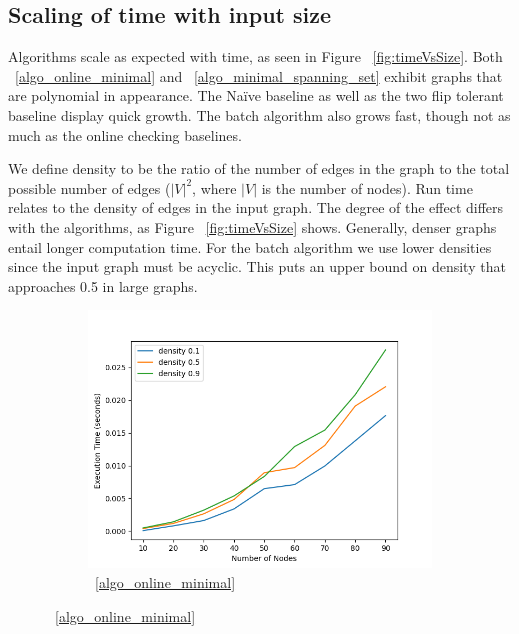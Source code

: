 \documentclass[sigplan,review,anonymous]{acmart}
\begin{document}
{\subsection{Scaling of time with input size}

Algorithms scale as expected with time, as seen in Figure ~\ref{fig:timeVsSize}. 
Both ~\ref{algo_online_minimal} and ~\ref{algo_minimal_spanning_set} exhibit graphs that are polynomial in appearance.
The Na\"{i}ve baseline as well as the two flip tolerant baseline display quick growth.
The batch algorithm also grows fast, though not as much as the online checking baselines.

We define density to be the ratio of the number of edges in the graph to the total possible number of edges ($|V|^2$, where $|V|$ is the number of nodes).
Run time relates to the density of edges in the input graph.
The degree of the effect differs with the algorithms, as Figure ~\ref{fig:timeVsSize} shows.
Generally, denser graphs entail longer computation time.
For the batch algorithm we use lower densities since the input graph must be acyclic. This puts an upper bound on density that approaches 0.5 in large graphs.

\begin{figure}
    \begin{subfigure}{0.5\linewidth}
      \includegraphics[width=.8\linewidth]{timeVsSize_10_OptimalSet.png}
      \caption{~\ref{algo_online_minimal}}
      \label{fig:sfigOptimalTvsS}
    \end{subfigure}


\end{figure}}
\end{document}
